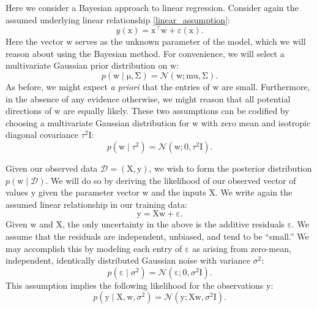 \documentclass{article}
\newcommand{\given}{\mid}
\newcommand{\mc}[1]{\mathcal{#1}}
\newcommand{\data}{\mc{D}}
\newcommand{\trans}{^\top}
\newcommand{\mat}[1]{\bm{\mathrm{#1}}}
\renewcommand{\vec}[1]{\bm{\mathrm{#1}}}
\renewcommand{\epsilon}{\varepsilon}
\begin{document}
Here we consider a Bayesian approach to linear regression. Consider
again the assumed underlying linear relationship \eqref{linear_assumption}:
\begin{equation*}
  y(\vec{x}) = \vec{x}\trans \vec{w} + \epsilon(\vec{x}).
\end{equation*}
Here the vector $\vec{w}$ serves as the unknown parameter of the
model, which we will reason about using the Bayesian method.  For
convenience, we will select a multivariate Gaussian prior distribution
on $\vec{w}$:
\begin{equation*}
  p(\vec{w} \given \vec{\mu}, \mat{\Sigma})
  =
  \mc{N}(\vec{w}; \vec{mu}, \mat{\Sigma}).
\end{equation*}
As before, we might expect \emph{a priori} that the entries of
$\vec{w}$ are small.  Furthermore, in the absence of any evidence
otherwise, we might reason that all potential directions of $\vec{w}$
are equally likely.  These two assumptions can be codified by choosing
a multivariate Gaussian distribution for $\vec{w}$ with zero mean and
isotropic diagonal covariance $\tau^2 \mat{I}$:
\begin{equation*}
  p(\vec{w} \given \tau^2)
  =
  \mc{N}(\vec{w}; \vec{0}, \tau^2\mat{I}).
\end{equation*}

Given our observed data $\data = (\mat{X}, \vec{y})$, we wish to form
the posterior distribution $p(\vec{w} \given \data)$.  We will do so
by deriving the likelihood of our observed vector of values $\vec{y}$
given the parameter vector $\vec{w}$ and the inputs $\mat{X}$.  We
write again the assumed linear relationship in our training data:
\begin{equation*}
  \vec{y} = \mat{X}\vec{w} + \vec{\epsilon}.
\end{equation*}
Given $\vec{w}$ and $\mat{X}$, the only uncertainty in the above is
the additive residuals $\vec{\epsilon}$.  We assume that the residuals
are independent, unbiased, and tend to be ``small.''  We may
accomplish this by modeling each entry of $\vec{\epsilon}$ as arising
from zero-mean, independent, identically distributed Gaussian noise
with variance $\sigma^2$:
\begin{equation*}
  p(\vec{\epsilon} \given \sigma^2)
  =
  \mc{N}(\vec{\epsilon}; \vec{0}, \sigma^2 \mat{I}).
\end{equation*}
This assumption implies the following likelihood for the observations
$\vec{y}$:
\begin{equation*}
  p(\vec{y} \given \mat{X}, \vec{w}, \sigma^2)
  =
  \mc{N}(\vec{y}; \mat{X}\vec{w}, \sigma^2\mat{I}).
\end{equation*}
\end{document}
